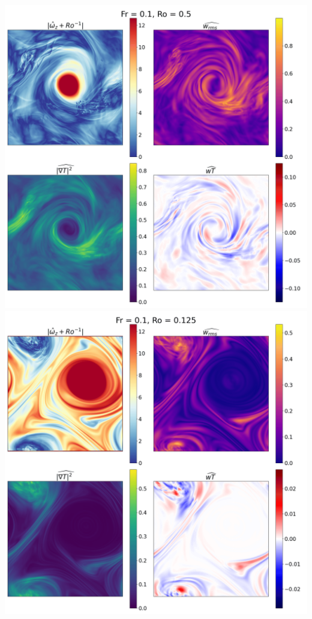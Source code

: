 \documentclass[30pt, blockverticalspace=1cm]{tikzposter}
\begin{document}
\begin{columns}
{    \begin{center}
        \centering
        \includegraphics[width=.95\linewidth]{images/Om2B100Re600Pe60_vert_avg.png}
    \emp
        \centering
        \includegraphics[width=.95\linewidth]{images/Om8B100Re600Pe60_vert_avg.png}
    \emp


\end{center}}
\end{columns}
\end{document}
